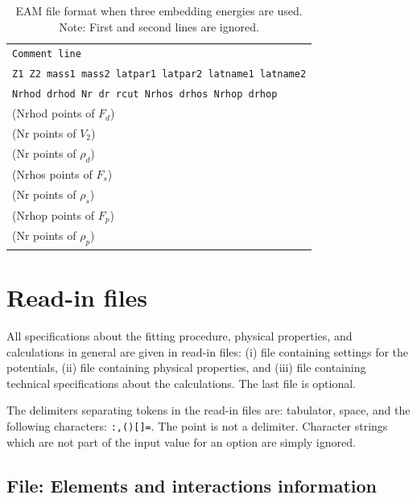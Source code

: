 \documentclass[a4paper,12pt,pdftex,onecolumn]{article}
\begin{document}
\begin{table}[!h]
\caption{
EAM file format when three embedding energies are used.
Note: First and second lines are ignored.
\label{tab:kw-eam-ff3}
}
\begin{center}
\begin{tabular}{|l|}
\hline
\hline
\verb+Comment line+ \\
\verb+Z1 Z2 mass1 mass2 latpar1 latpar2 latname1 latname2+ \\
\verb+Nrhod drhod Nr dr rcut Nrhos drhos Nrhop drhop+ \\
(Nrhod points of $F_d$) \\
(Nr points of $V_2$) \\
(Nr points of $\rho_d$) \\
(Nrhos points of $F_s$) \\
(Nr points of $\rho_s$) \\
(Nrhop points of $F_p$) \\
(Nr points of $\rho_p$) \\
\hline
\hline
\end{tabular}
\end{center}
\end{table}








\section{Read-in files}


All specifications about the fitting procedure, physical properties,
and calculations in general are given in read-in files:
(i) file containing settings for the potentials,
(ii) file containing physical properties, and
(iii) file containing technical specifications about the
calculations. The last file is optional.

The delimiters separating tokens in the read-in files are:
tabulator, space, and the following characters: \verb+:,()[]=+. The
point is not a delimiter. Character strings which are not part of the
input value for an option are simply ignored.





\subsection{File: Elements and interactions information}
\end{document}
